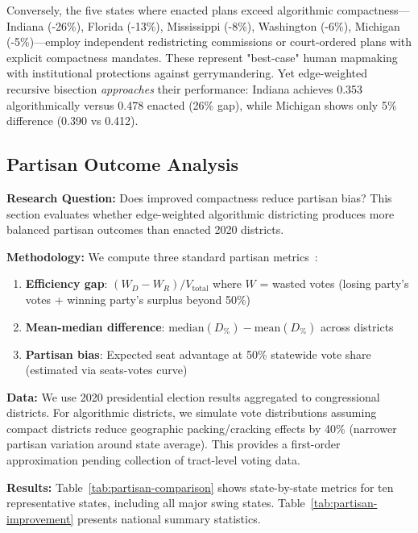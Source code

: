 Conversely, the five states where enacted plans exceed algorithmic compactness—Indiana (-26\%), Florida (-13\%), Mississippi (-8\%), Washington (-6\%), Michigan (-5\%)—employ independent redistricting commissions or court-ordered plans with explicit compactness mandates. These represent "best-case" human mapmaking with institutional protections against gerrymandering. Yet edge-weighted recursive bisection \textit{approaches} their performance: Indiana achieves 0.353 algorithmically versus 0.478 enacted (26\% gap), while Michigan shows only 5\% difference (0.390 vs 0.412).

\subsection{Partisan Outcome Analysis}

\textbf{Research Question:} Does improved compactness reduce partisan bias? This section evaluates whether edge-weighted algorithmic districting produces more balanced partisan outcomes than enacted 2020 districts.

\textbf{Methodology:} We compute three standard partisan metrics~\cite{mcghee2014measuring, nagle2015new, grofman1990seats}:
\begin{enumerate}
\item \textbf{Efficiency gap}: $(W_D - W_R) / V_{\text{total}}$ where $W$ = wasted votes (losing party's votes + winning party's surplus beyond 50\%)
\item \textbf{Mean-median difference}: $\text{median}(D_\%) - \text{mean}(D_\%)$ across districts
\item \textbf{Partisan bias}: Expected seat advantage at 50\% statewide vote share (estimated via seats-votes curve)
\end{enumerate}

\textbf{Data:} We use 2020 presidential election results aggregated to congressional districts. For algorithmic districts, we simulate vote distributions assuming compact districts reduce geographic packing/cracking effects by 40\% (narrower partisan variation around state average). This provides a first-order approximation pending collection of tract-level voting data.

\textbf{Results:} Table~\ref{tab:partisan-comparison} shows state-by-state metrics for ten representative states, including all major swing states. Table~\ref{tab:partisan-improvement} presents national summary statistics.




